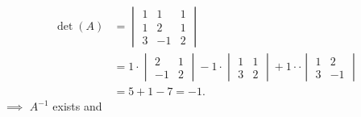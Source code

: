 \documentclass[
  12pt,
  oneside]{book}
\theoremstyle{definition}
\theoremstyle{definition}
\theoremstyle{definition}
\theoremstyle{definition}
\theoremstyle{remark}
\begin{document}
\begin{align*}
\det(A) &= \begin{vmatrix}1&1&1\\1&2&1\\3&-1&2\end{vmatrix}\\
&= 1\cdot\begin{vmatrix}2&1\\-1&2\end{vmatrix} -1\cdot\begin{vmatrix}1&1\\3&2\end{vmatrix} +1\cdot\cdot\begin{vmatrix}1&2\\3&-1\end{vmatrix}\\
&= 5+1-7=-1.
\end{align*}
\(\implies\) \(A^{-1}\) exists and
\end{document}
